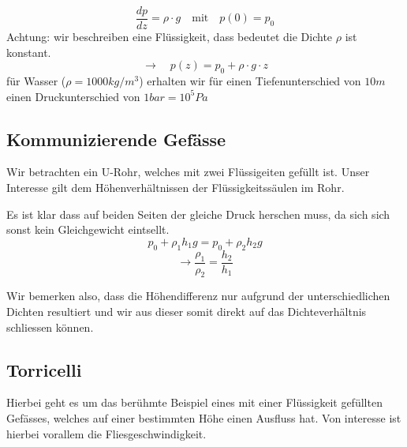 \documentclass[12pt]{article}
\begin{document}
 \begin{figure}[H]
  \label{fig:1teil}
\end{figure} 

\begin{equation}
\dfrac{dp}{dz} = \rho \cdot g \quad \mathrm{mit} \quad p(0) = p_0
\end{equation}
Achtung: wir beschreiben eine Flüssigkeit, dass bedeutet die Dichte $\rho$ ist konstant.
\begin{equation}
\rightarrow \quad p(z) = p_0 + \rho \cdot g \cdot z
\end{equation}
für Wasser ($\rho = 1000kg/m^3$) erhalten wir für einen Tiefenunterschied von $10m$ einen Druckunterschied von $1bar = 10^5Pa$

\subsection{Kommunizierende Gefässe}
Wir betrachten ein U-Rohr, welches mit zwei Flüssigeiten gefüllt ist. Unser Interesse gilt dem Höhenverhältnissen der Flüssigkeitssäulen im Rohr.

 \begin{figure}[H]
  \label{fig:1teil}
\end{figure}
Es ist klar dass auf beiden Seiten der gleiche Druck herschen muss, da sich sich sonst kein Gleichgewicht eintsellt.
\begin{equation}
p_0 + \rho_1 h_1 g = p_0 + \rho_2 h_2 g
\end{equation}
\begin{equation}
\rightarrow \dfrac{\rho_1}{\rho_2} = \dfrac{h_2}{h_1}
\end{equation}

Wir bemerken also, dass die Höhendifferenz nur aufgrund der unterschiedlichen Dichten resultiert und wir aus dieser somit direkt auf das Dichteverhältnis schliessen können.

\subsection{Torricelli}
Hierbei geht es um das berühmte Beispiel eines mit einer Flüssigkeit gefüllten Gefässes, welches auf einer bestimmten Höhe einen Ausfluss hat. Von interesse ist hierbei vorallem die Fliesgeschwindigkeit.
 \begin{figure}[H]
  \label{fig:1teil}
\end{figure}
\end{document}

